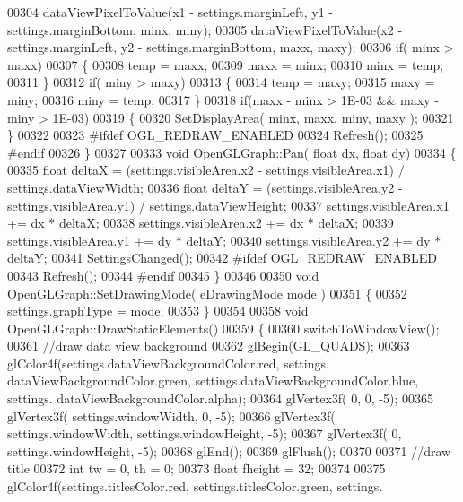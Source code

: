 \begin{DoxyCode}
{00304     dataViewPixelToValue(x1 - settings.marginLeft, y1 - settings.marginBottom, minx, miny);
00305     dataViewPixelToValue(x2 - settings.marginLeft, y2 - settings.marginBottom, maxx, maxy);
00306     \textcolor{keywordflow}{if}( minx > maxx)
00307     \{
00308         temp = maxx;
00309         maxx = minx;
00310         minx = temp;
00311     \}
00312     \textcolor{keywordflow}{if}( miny > maxy)
00313     \{
00314         temp = maxy;
00315         maxy = miny;
00316         miny = temp;
00317     \}
00318     \textcolor{keywordflow}{if}(maxx - minx > 1E-03 && maxy - miny > 1E-03)
00319     \{
00320         SetDisplayArea( minx, maxx, miny, maxy );
00321     \}
00322 
00323 \textcolor{preprocessor}{#ifdef OGL\_REDRAW\_ENABLED}
00324     Refresh();
00325 \textcolor{preprocessor}{#endif}
00326 \}
00327 
00333 \textcolor{keywordtype}{void} OpenGLGraph::Pan( \textcolor{keywordtype}{float} dx, \textcolor{keywordtype}{float} dy)
00334 \{
00335     \textcolor{keywordtype}{float} deltaX = (settings.visibleArea.x2 - settings.visibleArea.x1) / 
      settings.dataViewWidth;
00336     \textcolor{keywordtype}{float} deltaY = (settings.visibleArea.y2 - settings.visibleArea.y1) / 
      settings.dataViewHeight;
00337     settings.visibleArea.x1 += dx * deltaX;
00338     settings.visibleArea.x2 += dx * deltaX;
00339     settings.visibleArea.y1 += dy * deltaY;
00340     settings.visibleArea.y2 += dy * deltaY;
00341     SettingsChanged();
00342 \textcolor{preprocessor}{#ifdef OGL\_REDRAW\_ENABLED}
00343     Refresh();
00344 \textcolor{preprocessor}{#endif}
00345 \}
00346 
00350 \textcolor{keywordtype}{void} OpenGLGraph::SetDrawingMode( eDrawingMode mode )
00351 \{
00352     settings.graphType = mode;
00353 \}
00354 
00358 \textcolor{keywordtype}{void} OpenGLGraph::DrawStaticElements()
00359 \{
00360     switchToWindowView();
00361     \textcolor{comment}{//draw data view background}
00362     glBegin(GL_QUADS);
00363         glColor4f(settings.dataViewBackgroundColor.red, settings.
      dataViewBackgroundColor.green,  settings.dataViewBackgroundColor.blue, settings.
      dataViewBackgroundColor.alpha);
00364         glVertex3f( 0, 0, -5);
00365         glVertex3f( settings.windowWidth, 0, -5);
00366         glVertex3f( settings.windowWidth, settings.windowHeight, -5);
00367         glVertex3f( 0, settings.windowHeight, -5);
00368     glEnd();
00369     glFlush();
00370 
00371     \textcolor{comment}{//draw title}
00372     \textcolor{keywordtype}{int} tw = 0, th = 0;
00373     \textcolor{keywordtype}{float} fheight = 32;
00374 
00375     glColor4f(settings.titlesColor.red, settings.titlesColor.green, settings.
}
\end{DoxyCode}
